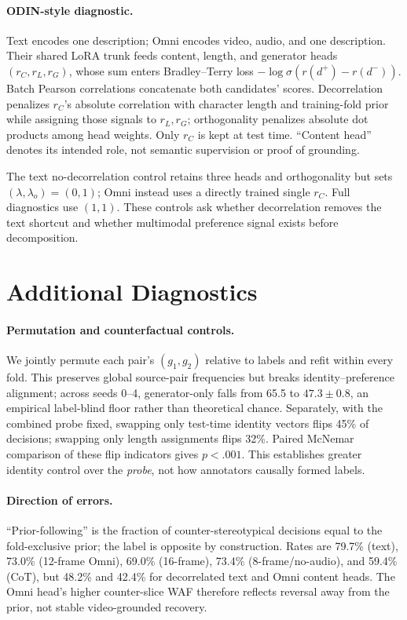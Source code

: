 \paragraph{ODIN-style diagnostic.}
Text encodes one description; Omni encodes video, audio, and one description. Their shared LoRA trunk feeds content, length, and generator heads $(r_C,r_L,r_G)$, whose sum enters Bradley--Terry loss $-\log\sigma(r(d^+)-r(d^-))$. Batch Pearson correlations concatenate both candidates' scores. Decorrelation penalizes $r_C$'s absolute correlation with character length and training-fold prior while assigning those signals to $r_L,r_G$; orthogonality penalizes absolute dot products among head weights. Only $r_C$ is kept at test time. ``Content head'' denotes its intended role, not semantic supervision or proof of grounding.

The text no-decorrelation control retains three heads and orthogonality but sets $(\lambda,\lambda_o)=(0,1)$; Omni instead uses a directly trained single $r_C$. Full diagnostics use $(1,1)$. These controls ask whether decorrelation removes the text shortcut and whether multimodal preference signal exists before decomposition.

\section{Additional Diagnostics}
\label{app:diagnostics}

\paragraph{Permutation and counterfactual controls.}
We jointly permute each pair's $(g_1,g_2)$ relative to labels and refit within every fold. This preserves global source-pair frequencies but breaks identity--preference alignment; across seeds 0--4, generator-only \waf falls from 65.5 to $47.3\mathbin{\pm}0.8$, an empirical label-blind floor rather than theoretical chance. Separately, with the combined probe fixed, swapping only test-time identity vectors flips 45\% of decisions; swapping only length assignments flips 32\%. Paired McNemar comparison of these flip indicators gives $p<.001$. This establishes greater identity control over the \emph{probe}, not how annotators causally formed labels.

\paragraph{Direction of errors.}
``Prior-following'' is the fraction of counter-stereotypical decisions equal to the fold-exclusive prior; the label is opposite by construction. Rates are 79.7\% (text), 73.0\% (12-frame Omni), 69.0\% (16-frame), 73.4\% (8-frame/no-audio), and 59.4\% (CoT), but 48.2\% and 42.4\% for decorrelated text and Omni content heads. The Omni head's higher counter-slice WAF therefore reflects reversal away from the prior, not stable video-grounded recovery.
